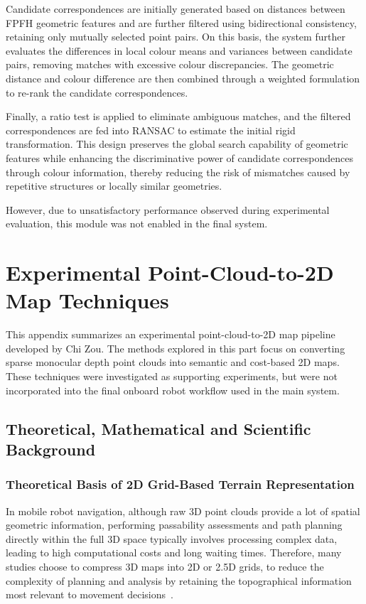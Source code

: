 \documentclass[12pt]{interim_report}
\begin{document}
Candidate correspondences are initially generated based on distances between FPFH geometric features and are further filtered using bidirectional consistency, retaining only mutually selected point pairs. On this basis, the system further evaluates the differences in local colour means and variances between candidate pairs, removing matches with excessive colour discrepancies. The geometric distance and colour difference are then combined through a weighted formulation to re-rank the candidate correspondences.

Finally, a ratio test is applied to eliminate ambiguous matches, and the filtered correspondences are fed into RANSAC to estimate the initial rigid transformation. This design preserves the global search capability of geometric features while enhancing the discriminative power of candidate correspondences through colour information, thereby reducing the risk of mismatches caused by repetitive structures or locally similar geometries.

However, due to unsatisfactory performance observed during experimental evaluation, this module was not enabled in the final system.
\section{Experimental Point-Cloud-to-2D Map Techniques}
\label{app:chi-zou-2dmap}

This appendix summarizes an experimental point-cloud-to-2D map pipeline developed by Chi Zou. The methods explored in this part focus on converting sparse monocular depth point clouds into semantic and cost-based 2D maps. These techniques were investigated as supporting experiments, but were not incorporated into the final onboard robot workflow used in the main system.

\subsection{Theoretical, Mathematical and Scientific Background}
\label{subsec:chizou-background}

\subsubsection{Theoretical Basis of 2D Grid-Based Terrain Representation}
\label{subsec:chizou-grid-terrain-theory}

In mobile robot navigation, although raw 3D point clouds provide a lot of spatial geometric information, performing passability assessments and path planning directly within the full 3D space typically involves processing complex data, leading to high computational costs and long waiting times. Therefore, many studies choose to compress 3D maps into 2D or 2.5D grids, to reduce the complexity of planning and analysis by retaining the topographical information most relevant to movement decisions~\cite{meng2018terrain,sanchez2019pff}.
\end{document}
